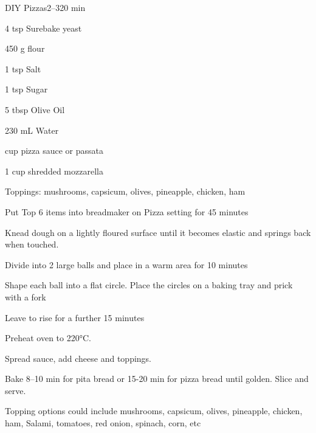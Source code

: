 \begin{recipebox}{DIY Pizzas}{2--3}{20 min}
\begin{ingredients}
  \item 4 tsp Surebake yeast
  \item 450 g flour
  \item 1 tsp Salt
  \item 1 tsp Sugar
  \item 5 tbsp Olive Oil
  \item 230 mL Water
  \item {} cup pizza sauce or passata
  \item 1 cup shredded mozzarella
  \item Toppings: mushrooms, capsicum, olives, pineapple, chicken, ham
\end{ingredients}

\begin{method}
  \item Put Top 6 items into breadmaker on Pizza setting for 45 minutes
  \item Knead dough on a lightly floured surface until it becomes elastic and springs back when touched.
  \item Divide into 2 large balls and place in a warm area for 10 minutes
  \item Shape each ball into a flat circle. Place the circles on a baking tray and prick with a fork
  \item Leave to rise for a further 15 minutes
  \item Preheat oven to 220°C.
  \item Spread sauce, add cheese and toppings.
  \item Bake 8–10 min for pita bread or 15-20 min for pizza bread until golden. Slice and serve.
\end{method}
\begin{notes}
Topping options could include mushrooms, capsicum, olives, pineapple, chicken, ham, Salami, tomatoes, red onion, spinach, corn, etc
\end{notes}
\end{recipebox}

